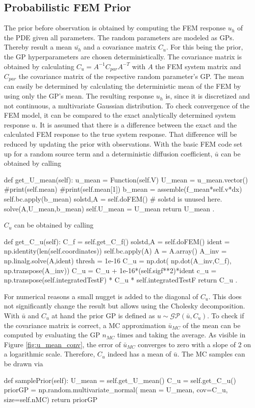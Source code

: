 \documentclass[%
  a4paper,oneside,%
  11pt,%
  smallchapters,
  green,%
  rgb, <cmyk>
  ,]{tubsbook}
\begin{document}
\subsection{Probabilistic FEM Prior}
The prior before observation is obtained by computing the FEM response $u_h$ of the PDE given all parameters. The random parameters are modeled as GPs. Thereby result a mean $\bar{u_h}$ and a covariance matrix $C_u$. For this being the prior, the GP hyperparameters are chosen deterministically. The covariance matrix is obtained by calculating $C_u = A^{-1} C_{par} A^{-T}$ with $A$ the FEM system matrix and $C_{par}$ the covariance matrix of the respective random parameter's GP. The mean can easily be determined by calculating the deterministic mean of the FEM by using only the GP's mean.
The resulting response $u_h$ is, since it is discretized and not continuous, a multivariate Gaussian distribution.
%
To check convergence of the FEM model, it can be compared to the exact analytically determined system response $u$. 
%
It is assumed that there is a difference between the exact and the calculated FEM response to the true system response. That difference will be reduced by updating the prior with observations.
%
With the basic FEM code set up for a random source term and a deterministic diffusion coefficient, $\bar{u}$ can be obtained by calling
\begin{python}
def get_U_mean(self):
	u_mean = Function(self.V)
	U_mean = u_mean.vector()
	#print(self.mean)
	#print(self.mean[1])
	b_mean = assemble(f_mean*self.v*dx) 
	self.bc.apply(b_mean)
	solstd,A = self.doFEM()  # solstd is unused here.
	solve(A,U_mean,b_mean)
	self.U_mean = U_mean
	return U_mean .
\end{python}
\label{lst:get_u_mean}
$C_u$ can be obtained by calling
\begin{python}
def get_C_u(self):
	C_f = self.get_C_f()
	solstd,A = self.doFEM()
	ident = np.identity(len(self.coordinates))
	self.bc.apply(A)
	A = A.array()
	A_inv = np.linalg.solve(A,ident)
	thresh = 1e-16
	C_u = np.dot( np.dot(A_inv,C_f), np.transpose(A_inv))
	C_u = C_u + 1e-16*(self.sigf**2)*ident
	c_u = np.transpose(self.integratedTestF) * C_u * self.integratedTestF
	return C_u .
\end{python}
\label{lst:get_C_u}
For numerical reasons a small nugget is added to the diagonal of $C_u$. This does not significantly change the result but allows using the Cholesky decomposition.
With $\bar{u}$ and $C_u$ at hand the prior GP is defined as $u \sim \mathcal{GP}(\bar{u},C_u)$. To check if the covariance matrix is correct, a MC approximation $\bar{u}_{MC}$ of the mean can be computed by evaluating the GP $n_{MC}$ times and taking the average. As visible in Figure \ref{fig:u_mean_conv}, the error of $\bar{u}_{MC}$ converges to zero with a slope of 2 on a logarithmic scale. Therefore, $C_u$ indeed has a mean of $\bar{u}$.
The MC samples can be drawn via
\begin{python}
def samplePrior(self):
	U_mean = self.get_U_mean()
	C_u = self.get_C_u()
	priorGP = np.random.multivariate_normal(
		mean = U_mean, cov=C_u,
		size=self.nMC)
	return priorGP
\end{python}
\end{document}
